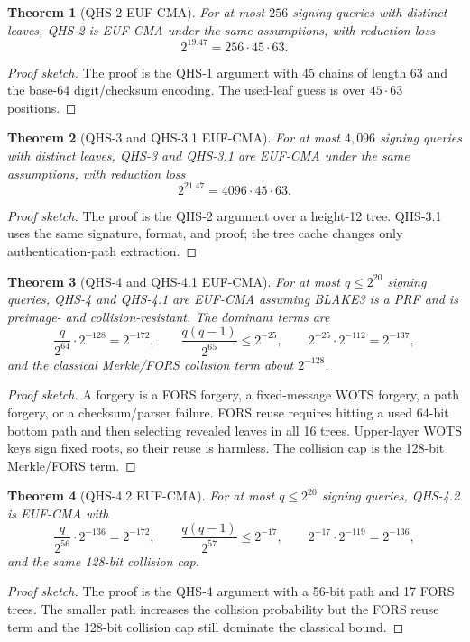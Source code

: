 \documentclass[11pt,a4paper]{article}
\newtheorem{theorem}{Theorem}[section]
\theoremstyle{remark}
\begin{document}
\begin{theorem}[QHS-2 EUF-CMA]
For at most \(256\) signing queries with distinct leaves, QHS-2 is EUF-CMA
under the same assumptions, with reduction loss
\[
2^{19.47}=256\cdot45\cdot63.
\]
\end{theorem}
\begin{proof}[Proof sketch]
The proof is the QHS-1 argument with 45 chains of length 63 and the base-64
digit/checksum encoding. The used-leaf guess is over \(45\cdot63\) positions.
\end{proof}

\begin{theorem}[QHS-3 and QHS-3.1 EUF-CMA]
For at most \(4{,}096\) signing queries with distinct leaves, QHS-3 and
QHS-3.1 are EUF-CMA under the same assumptions, with reduction loss
\[
2^{21.47}=4096\cdot45\cdot63.
\]
\end{theorem}
\begin{proof}[Proof sketch]
The proof is the QHS-2 argument over a height-12 tree. QHS-3.1 uses the same
signature, format, and proof; the tree cache changes only authentication-path
extraction.
\end{proof}

\begin{theorem}[QHS-4 and QHS-4.1 EUF-CMA]
For at most \(q\le2^{20}\) signing queries, QHS-4 and QHS-4.1 are EUF-CMA
assuming BLAKE3 is a PRF and is preimage- and collision-resistant. The
dominant terms are
\[
\frac{q}{2^{64}}\cdot2^{-128}=2^{-172},
\qquad
\frac{q(q-1)}{2^{65}}\le2^{-25},
\qquad
2^{-25}\cdot2^{-112}=2^{-137},
\]
and the classical Merkle/FORS collision term about \(2^{-128}\).
\end{theorem}
\begin{proof}[Proof sketch]
A forgery is a FORS forgery, a fixed-message WOTS forgery, a path forgery, or a
checksum/parser failure. FORS reuse requires hitting a used 64-bit bottom path
and then selecting revealed leaves in all 16 trees. Upper-layer WOTS keys sign
fixed roots, so their reuse is harmless. The collision cap is the 128-bit
Merkle/FORS term.
\end{proof}

\begin{theorem}[QHS-4.2 EUF-CMA]
For at most \(q\le2^{20}\) signing queries, QHS-4.2 is EUF-CMA with
\[
\frac{q}{2^{56}}\cdot2^{-136}=2^{-172},
\qquad
\frac{q(q-1)}{2^{57}}\le2^{-17},
\qquad
2^{-17}\cdot2^{-119}=2^{-136},
\]
and the same 128-bit collision cap.
\end{theorem}
\begin{proof}[Proof sketch]
The proof is the QHS-4 argument with a 56-bit path and 17 FORS trees. The
smaller path increases the collision probability but the FORS reuse term and
the 128-bit collision cap still dominate the classical bound.
\end{proof}
\end{document}
